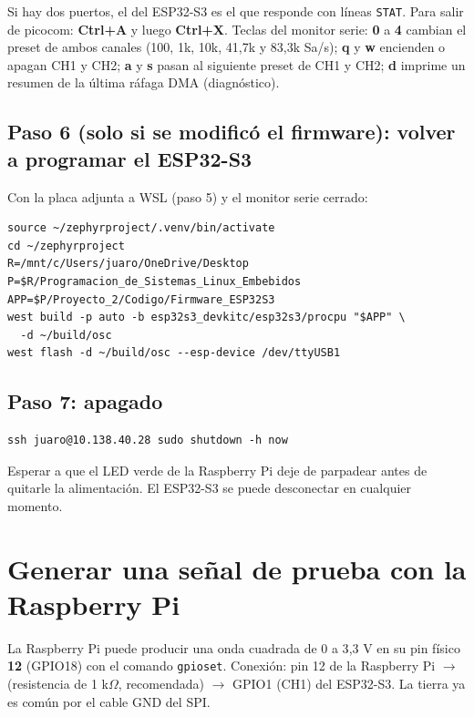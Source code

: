 \documentclass[12pt,a4paper]{article}
\begin{document}
Si hay dos puertos, el del ESP32-S3 es el que responde con líneas \texttt{STAT}. Para salir de picocom: \textbf{Ctrl+A} y luego \textbf{Ctrl+X}. Teclas del monitor serie: \textbf{0} a \textbf{4} cambian el preset de ambos canales (100, 1k, 10k, 41,7k y 83,3k Sa/s); \textbf{q} y \textbf{w} encienden o apagan CH1 y CH2; \textbf{a} y \textbf{s} pasan al siguiente preset de CH1 y CH2; \textbf{d} imprime un resumen de la última ráfaga DMA (diagnóstico).

\subsection{Paso 6 (solo si se modificó el firmware): volver a programar el ESP32-S3}

Con la placa adjunta a WSL (paso 5) y el monitor serie cerrado:

\begin{verbatim}
source ~/zephyrproject/.venv/bin/activate
cd ~/zephyrproject
R=/mnt/c/Users/juaro/OneDrive/Desktop
P=$R/Programacion_de_Sistemas_Linux_Embebidos
APP=$P/Proyecto_2/Codigo/Firmware_ESP32S3
west build -p auto -b esp32s3_devkitc/esp32s3/procpu "$APP" \
  -d ~/build/osc
west flash -d ~/build/osc --esp-device /dev/ttyUSB1
\end{verbatim}

\subsection{Paso 7: apagado}

\begin{verbatim}
ssh juaro@10.138.40.28 sudo shutdown -h now
\end{verbatim}

Esperar a que el LED verde de la Raspberry Pi deje de parpadear antes de quitarle la alimentación. El ESP32-S3 se puede desconectar en cualquier momento.

\section{Generar una señal de prueba con la Raspberry Pi}

La Raspberry Pi puede producir una onda cuadrada de 0 a 3{,}3 V en su pin físico \textbf{12} (GPIO18) con el comando \texttt{gpioset}. Conexión: pin 12 de la Raspberry Pi $\rightarrow$ (resistencia de 1 k$\Omega$, recomendada) $\rightarrow$ GPIO1 (CH1) del ESP32-S3. La tierra ya es común por el cable GND del SPI.
\end{document}
